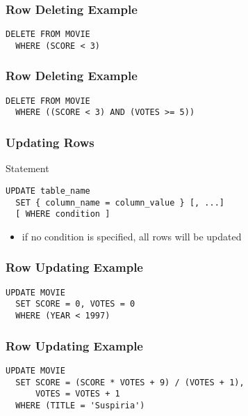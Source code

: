 \documentclass[dvipsnames]{beamer}
\theoremstyle{plain}
\begin{document}
\begin{frame}[fragile]
  \frametitle{Row Deleting Example}

  \begin{example}
    \begin{lstlisting}
DELETE FROM MOVIE
  WHERE (SCORE < 3)
    \end{lstlisting}
  \end{example}
\end{frame}

\begin{frame}[fragile]
  \frametitle{Row Deleting Example}

  \begin{example}
    \begin{lstlisting}
DELETE FROM MOVIE
  WHERE ((SCORE < 3) AND (VOTES >= 5))
    \end{lstlisting}
  \end{example}
\end{frame}

\begin{frame}[fragile]
  \frametitle{Updating Rows}

  \begin{block}{Statement}
    \begin{lstlisting}
UPDATE table_name
  SET { column_name = column_value } [, ...]
  [ WHERE condition ]
    \end{lstlisting}
  \end{block}

  \pause
  \begin{itemize}
    \item if no condition is specified, all rows will be updated
  \end{itemize}
\end{frame}

\begin{frame}[fragile]
  \frametitle{Row Updating Example}

  \begin{example}
    \begin{lstlisting}
UPDATE MOVIE
  SET SCORE = 0, VOTES = 0
  WHERE (YEAR < 1997)
    \end{lstlisting}
  \end{example}
\end{frame}

\begin{frame}[fragile]
  \frametitle{Row Updating Example}

  \begin{example}
    \begin{lstlisting}
UPDATE MOVIE
  SET SCORE = (SCORE * VOTES + 9) / (VOTES + 1),
      VOTES = VOTES + 1
  WHERE (TITLE = 'Suspiria')
    \end{lstlisting}
  \end{example}
\end{frame}
\end{document}
